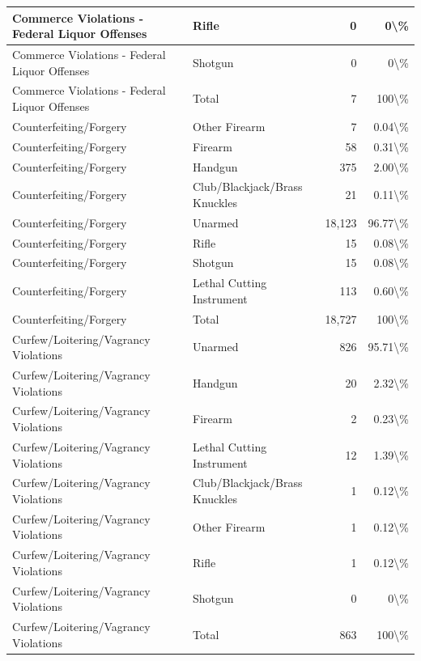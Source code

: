 \documentclass[
]{krantz}
\begin{document}
\begin{longtable}[t]{l|l|r|r}
\hline
Commerce Violations - Federal Liquor Offenses & Rifle & 0 & 0\textbackslash{}\%\\
\hline
Commerce Violations - Federal Liquor Offenses & Shotgun & 0 & 0\textbackslash{}\%\\
\hline
Commerce Violations - Federal Liquor Offenses & Total & 7 & 100\textbackslash{}\%\\
\hline
Counterfeiting/Forgery & Other Firearm & 7 & 0.04\textbackslash{}\%\\
\hline
Counterfeiting/Forgery & Firearm & 58 & 0.31\textbackslash{}\%\\
\hline
Counterfeiting/Forgery & Handgun & 375 & 2.00\textbackslash{}\%\\
\hline
Counterfeiting/Forgery & Club/Blackjack/Brass Knuckles & 21 & 0.11\textbackslash{}\%\\
\hline
Counterfeiting/Forgery & Unarmed & 18,123 & 96.77\textbackslash{}\%\\
\hline
Counterfeiting/Forgery & Rifle & 15 & 0.08\textbackslash{}\%\\
\hline
Counterfeiting/Forgery & Shotgun & 15 & 0.08\textbackslash{}\%\\
\hline
Counterfeiting/Forgery & Lethal Cutting Instrument & 113 & 0.60\textbackslash{}\%\\
\hline
Counterfeiting/Forgery & Total & 18,727 & 100\textbackslash{}\%\\
\hline
Curfew/Loitering/Vagrancy Violations & Unarmed & 826 & 95.71\textbackslash{}\%\\
\hline
Curfew/Loitering/Vagrancy Violations & Handgun & 20 & 2.32\textbackslash{}\%\\
\hline
Curfew/Loitering/Vagrancy Violations & Firearm & 2 & 0.23\textbackslash{}\%\\
\hline
Curfew/Loitering/Vagrancy Violations & Lethal Cutting Instrument & 12 & 1.39\textbackslash{}\%\\
\hline
Curfew/Loitering/Vagrancy Violations & Club/Blackjack/Brass Knuckles & 1 & 0.12\textbackslash{}\%\\
\hline
Curfew/Loitering/Vagrancy Violations & Other Firearm & 1 & 0.12\textbackslash{}\%\\
\hline
Curfew/Loitering/Vagrancy Violations & Rifle & 1 & 0.12\textbackslash{}\%\\
\hline
Curfew/Loitering/Vagrancy Violations & Shotgun & 0 & 0\textbackslash{}\%\\
\hline
Curfew/Loitering/Vagrancy Violations & Total & 863 & 100\textbackslash{}\%\\

\end{longtable}
\end{document}
